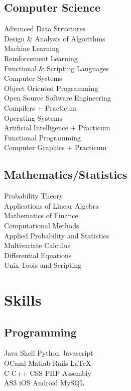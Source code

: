 \documentclass[]{deedy-resume-openfont}
\begin{document}
\begin{minipage}[t]{0.33\textwidth}
\subsection{Computer Science}
Advanced Data Structures \\
Design \& Analysis of Algorithms\\
Machine Learning\\
Reinforcement Learning\\
Functional \& Scripting Languages\\
Computer Systems\\
Object Oriented Programming\\
Open Source Software Engineering \\
Compilers + Practicum \\
Operating Systems \\
Artificial Intelligence + Practicum \\
Functional Programming \\
Computer Graphics + Practicum \\
\sectionsep

\subsection{Mathematics/Statistics}
Probability Theory\\
Applications of Linear Algebra\\
Mathematics of Finance\\
Computational Methods\\
Applied Probability and Statistics\\
Multivariate Calculus\\
Differential Equations\\
Unix Tools and Scripting \\


\section{Skills}
\subsection{Programming}
Java \textbullet{}   Shell \textbullet{} Python \textbullet{} Javascript \\
OCaml \textbullet{} Matlab \textbullet{} Rails \textbullet{} \LaTeX\ \\ 
C \textbullet{} C++ \textbullet{} CSS \textbullet{} PHP \textbullet{} Assembly \\
AS3 \textbullet{} iOS \textbullet{} Android \textbullet{} MySQL
\sectionsep

%
%

\end{minipage} 
\end{document}
